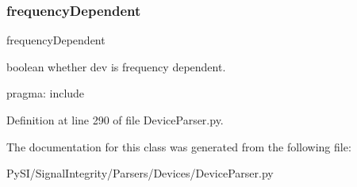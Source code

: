\subsubsection{\texorpdfstring{frequency\+Dependent}{frequencyDependent}}
{\footnotesize\ttfamily frequency\+Dependent}



boolean whether dev is frequency dependent. 

pragma\+: include 

Definition at line 290 of file Device\+Parser.\+py.



The documentation for this class was generated from the following file\+:\begin{DoxyCompactItemize}
\item 
Py\+S\+I/\+Signal\+Integrity/\+Parsers/\+Devices/Device\+Parser.\+py\end{DoxyCompactItemize}
